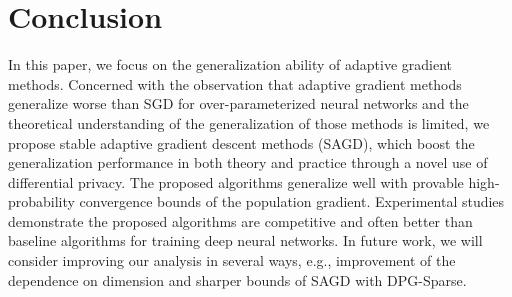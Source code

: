 \documentclass[11pt]{article}
\begin{document}
\section{Conclusion}
\label{sec: conclusion}
In this paper, we focus on the generalization ability of adaptive gradient methods. Concerned with the 
observation that adaptive gradient methods generalize worse than SGD for over-parameterized neural networks and the theoretical understanding of the generalization of those methods is limited,
we propose stable adaptive gradient descent methods (\textsc{SAGD}), which boost the generalization performance in both theory and practice through a novel use of differential privacy. The proposed algorithms generalize well with provable high-probability convergence bounds of the population gradient. Experimental studies demonstrate the proposed algorithms are competitive and often better than baseline algorithms for training deep neural networks. 
In future work, we will consider improving our analysis in several ways, e.g.,  improvement of the dependence on dimension and sharper bounds of \textsc{SAGD} with DPG-Sparse.



\clearpage




\clearpage


\appendix


\end{document}
